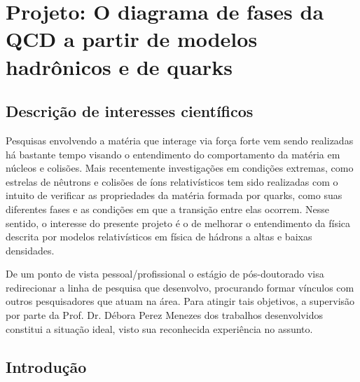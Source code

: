 \chapter{Projeto: O diagrama de fases da QCD a partir de modelos hadrônicos e de quarks}

\section*{Descrição de interesses científicos}

Pesquisas envolvendo a matéria que interage via força forte vem sendo realizadas há bastante tempo visando o entendimento do comportamento da matéria em núcleos e colisões. Mais recentemente investigações em condições extremas, como estrelas de nêutrons e colisões de íons relativísticos tem sido realizadas com o intuito de verificar as propriedades da matéria formada por quarks, como suas diferentes fases e as condições em que a transição entre elas ocorrem. Nesse sentido, o interesse do presente projeto é o de melhorar o entendimento da física descrita por modelos relativísticos em física de hádrons a altas e baixas densidades.

De um ponto de vista pessoal/profissional o estágio de pós-doutorado visa redirecionar a linha de pesquisa que desenvolvo, procurando formar vínculos com outros pesquisadores que atuam na área. Para atingir tais objetivos, a supervisão por parte da Prof\textordfeminine. Dr\textordfeminine. Débora Perez Menezes dos trabalhos desenvolvidos constitui a situação ideal, visto sua reconhecida experiência no assunto.

\section{Introdução}



